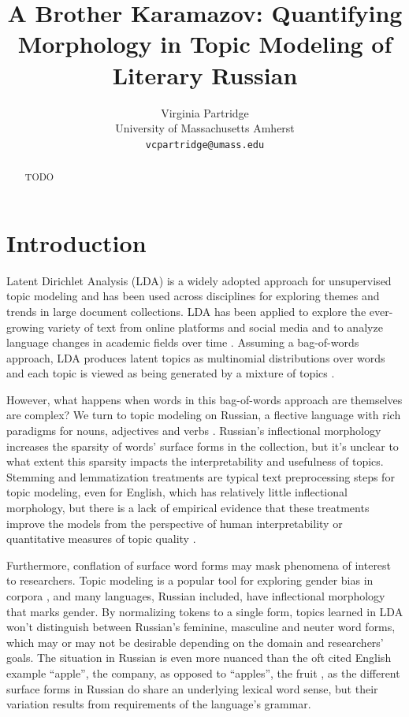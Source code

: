 \documentclass[11pt,a4paper]{article}
\title{A Brother Karamazov: Quantifying Morphology in Topic Modeling of Literary Russian}
\author{Virginia Partridge \\
  University of Massachusetts Amherst\\
  \texttt{vcpartridge@umass.edu}
}
\date{}
\begin{document}
\maketitle
\begin{abstract}
TODO
\end{abstract}

\section{Introduction}
Latent Dirichlet Analysis (LDA) is a widely adopted approach for unsupervised topic modeling and has been used across disciplines for exploring themes and trends in large document collections. LDA has been applied to explore the ever-growing variety of text from online platforms and social media and to analyze language changes in academic fields over time \cite{koltsova2013,mcfarland2013differentiating, vogel-jurafsky-2012-said, mitrofanova2015probabilistic}. Assuming a bag-of-words approach, LDA produces latent topics as multinomial distributions over words and each topic is viewed as being generated by a mixture of topics \cite{blei2003,steyvers2007probabilistic}.

However, what happens when words in this bag-of-words approach are themselves are complex? We turn to topic modeling on Russian, a flective language with rich paradigms for nouns, adjectives and verbs \cite{wade2020comprehensive}. Russian's inflectional morphology increases the sparsity of words' surface forms in the collection, but it's unclear to what extent this sparsity impacts the interpretability and usefulness of topics. Stemming and lemmatization treatments are typical text preprocessing steps for topic modeling, even for English, which has relatively little inflectional morphology, but there is a lack of empirical evidence that these treatments improve the models from the perspective of human interpretability or quantitative measures of topic quality \cite{schofield-mimno-2016-comparing}.

Furthermore, conflation of surface word forms may mask phenomena of interest to researchers. Topic modeling is a popular tool for exploring gender bias in corpora \cite{vogel-jurafsky-2012-said,devinney-etal-2020-semi}, and many languages, Russian included, have inflectional morphology that marks gender. By normalizing tokens to a single form, topics learned in LDA won't distinguish between Russian's feminine, masculine and neuter word forms, which may or may not be desirable depending on the domain and researchers' goals. The situation in Russian is even more nuanced than the oft cited English example ``apple'', the company, as opposed to ``apples'', the fruit \cite{schofield-mimno-2016-comparing}, as the different surface forms in Russian do share an underlying lexical word sense, but their variation results from requirements of the language's grammar.
\end{document}
